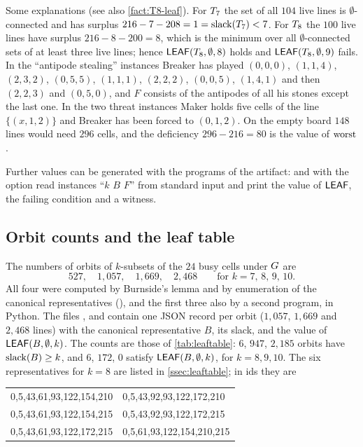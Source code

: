 Some explanations (see also \cref{fact:T8-leaf}). For $T_7$ the set of all $104$ live lines is
$\emptyset$-connected and has surplus $216-7-208=1=\operatorname{slack}(T_7)<7$. For $T_8$ the $100$ live lines
have surplus $216-8-200=8$, which is the minimum over all $\emptyset$-connected sets of at least three
live lines; hence $\mathsf{LEAF}(T_8,\emptyset,8)$ holds and $\mathsf{LEAF}(T_8,\emptyset,9)$ fails. In the ``antipode stealing''
instances Breaker has played $(0,0,0)$, $(1,1,4)$, $(2,3,2)$, $(0,5,5)$, $(1,1,1)$, $(2,2,2)$, $(0,0,5)$,
$(1,4,1)$ and then $(2,2,3)$ and $(0,5,0)$, and $F$ consists of the antipodes of all his stones except the
last one. In the two threat instances Maker holds five cells of the line $\{(x,1,2)\}$ and Breaker has been
forced to $(0,1,2)$. On the empty board $148$ lines would need $296$ cells, and the deficiency
$296-216=80$ is the value of $\operatorname{worst}$.

Further values can be generated with the programs of the artifact:  and
 with the option  read instances ``$k$ $B$ $F$'' from standard input and
print the value of $\mathsf{LEAF}$, the failing condition and a witness.

\subsection{Orbit counts and the leaf table}\label{ssec:fmt-orbits}

The numbers of orbits of $k$-subsets of the $24$ busy cells under $G$ are
\[
527,\quad 1{,}057,\quad 1{,}669,\quad 2{,}468\qquad\text{for } k=7,\,8,\,9,\,10 .
\]
All four were computed by Burnside's lemma and by enumeration of the canonical representatives
(), and the first three also by a second program, in Python. The files
,  and  contain one JSON record per
orbit ($1{,}057$, $1{,}669$ and $2{,}468$ lines) with the canonical representative $B$, its slack, and the value of
$\mathsf{LEAF}(B,\emptyset,k)$. The counts are those of \cref{tab:leaftable}:
$6$, $947$, $2{,}185$ orbits have $\operatorname{slack}(B)\ge k$, and $6$, $172$, $0$ satisfy $\mathsf{LEAF}(B,\emptyset,k)$, for
$k=8,9,10$. The six representatives for $k=8$ are listed in \cref{ssec:leaftable}; in ids they are
\begin{center}\small\ttfamily
\begin{tabular}{@{}ll@{}}
0,5,43,61,93,122,154,210 & 0,5,43,92,93,122,172,210\\
0,5,43,61,93,122,154,215 & 0,5,43,92,93,122,172,215\\
0,5,43,61,93,122,172,215 & 0,5,61,93,122,154,210,215
\end{tabular}
\end{center}

